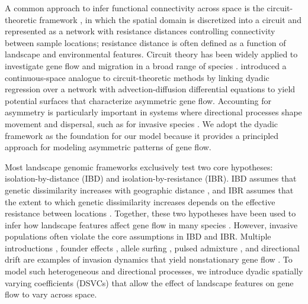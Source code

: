 \documentclass{article}
\begin{document}
A common approach to infer functional connectivity across space is the circuit-theoretic framework  \citep{mcrae2008using,hanks2013circuit}, 
in which the spatial domain is discretized into a circuit and represented as a network with resistance distances controlling connectivity between sample locations; resistance distance is often defined as a function of landscape and environmental features. Circuit theory has been widely applied to investigate gene flow and migration in a broad range of species \citep{hanks2016latent,fletcher2022extending,stack2026riverscape}. 
\cite{schwob2024composite} introduced a continuous-space analogue to circuit-theoretic methods by linking dyadic regression over a network with advection-diffusion differential equations to yield potential surfaces that characterize asymmetric gene flow. 
Accounting for asymmetry is particularly important in systems where directional processes shape movement and dispersal, such as for invasive species \citep{wilson2009something}.
We adopt the dyadic framework as the foundation for our model because it provides a principled approach for modeling asymmetric patterns of gene flow.

Most landscape genomic frameworks exclusively test two core hypotheses: isolation-by-distance (IBD) and isolation-by-resistance (IBR). IBD assumes that genetic dissimilarity increases with geographic distance \citep[][]{duforet2014nonstationary,shastry2025jointly}, and IBR assumes that the extent to which genetic dissimilarity increases depends on the effective resistance between locations \citep[i.e., the accumulated difficulty of traversing the landscape;][]{mcrae2006isolation}. Together, these two hypotheses have been used to infer how landscape features affect gene flow in many species \citep{mcrae2008using,novembre2008genes}.
However, invasive populations often violate the core assumptions in IBD and IBR. Multiple introductions \citep{vahsen2025phenological}, founder effects \citep{shirk2014patterns}, allele surfing \citep{goodsman2014genetic}, pulsed admixture \citep{chun2010gene}, and directional drift \citep[e.g., prevailing winds, rivers;][]{belouard2019genetic} are examples of invasion dynamics that yield nonstationary gene flow \citep{gamba2025local}. 
To model such heterogeneous and directional processes, we introduce dyadic spatially varying coefficients (DSVCs) that allow the effect of landscape features on gene flow to vary across space.
\end{document}
